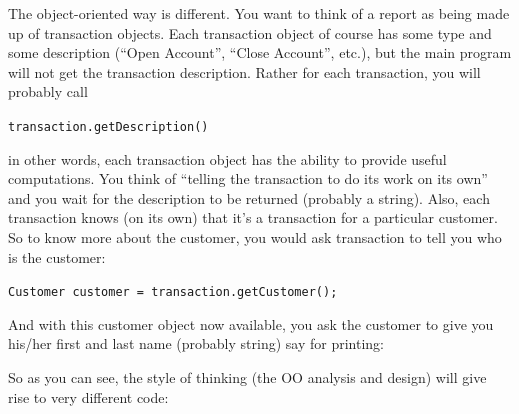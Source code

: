 The object-oriented way is different. You want to think of a report as
being made up of transaction objects. Each transaction object of course
has some type and some description (“Open Account”, “Close Account”,
etc.), but the main program will not get the transaction description.
Rather for each transaction, you will probably call

\begin{center}
\texttt{transaction.getDescription()}
\end{center}

in other words, each transaction object has the ability to provide useful
computations. You think of “telling the transaction to do its work on its 
own” and you wait for the description to be returned (probably a string).
Also, each transaction knows (on its own) that it's a transaction for a
particular customer. So to know more about the customer, you would ask
transaction to tell you who is the customer:
\begin{center}
\texttt{Customer customer = transaction.getCustomer();}
\end{center}

And with this customer object now available, you ask the customer to
give you his/her first and last name (probably string) say for printing:


So as you can see, the style of thinking (the OO analysis and design) will
give rise to very different code:

\\
 \\
 \\
 \\
 \\
 \\
 \\
 \\
 \\
 \\

